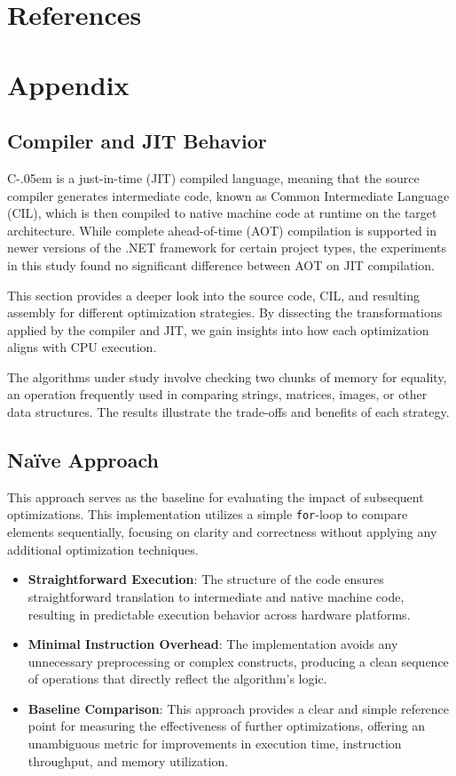 \documentclass{article}
\newcommand{\Csharp}{%
  {\settoheight{\dimen0}{C}C\kern-.05em \resizebox{!}{\dimen0}{\raisebox{\depth}{\# }}}}
\begin{document}
\section{References}

\section{Appendix}

\subsection{Compiler and JIT Behavior}

\Csharp is a just-in-time (JIT) compiled language, meaning that the source compiler generates intermediate code, known as Common Intermediate Language (CIL), which is then compiled to native machine code at runtime on the target architecture. While complete ahead-of-time (AOT) compilation is supported in newer versions of the .NET framework for certain project types, the experiments in this study found no significant difference between AOT on JIT compilation.

This section provides a deeper look into the source code, CIL, and resulting assembly for different optimization strategies. By dissecting the transformations applied by the compiler and JIT, we gain insights into how each optimization aligns with CPU execution.

The algorithms under study involve checking two chunks of memory for equality, an operation frequently used in comparing strings, matrices, images, or other data structures. The results illustrate the trade-offs and benefits of each strategy.

\subsection{Naïve Approach}

This approach serves as the baseline for evaluating the impact of subsequent optimizations. This implementation utilizes a simple \texttt{for}-loop to compare elements sequentially, focusing on clarity and correctness without applying any additional optimization techniques. 

\begin{itemize}
  \item \textbf{Straightforward Execution}: The structure of the code ensures straightforward translation to intermediate and native machine code, resulting in predictable execution behavior across hardware platforms.
  \item \textbf{Minimal Instruction Overhead}: The implementation avoids any unnecessary preprocessing or complex constructs, producing a clean sequence of operations that directly reflect the algorithm's logic.
  \item \textbf{Baseline Comparison}: This approach provides a clear and simple reference point for measuring the effectiveness of further optimizations, offering an unambiguous metric for improvements in execution time, instruction throughput, and memory utilization.
\end{itemize}
\end{document}
